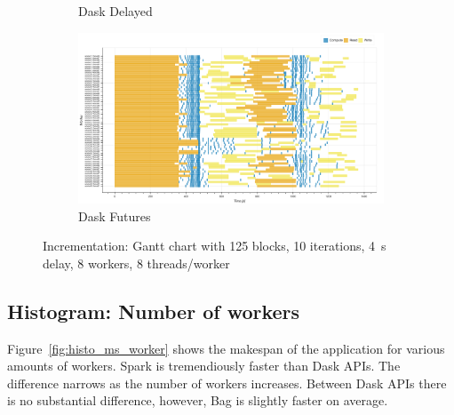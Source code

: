 \documentclass[conference]{IEEEtran}
\begin{document}
\begin{figure}[!htb]
\begin{subfigure}[b]{\columnwidth}
        \caption{Dask Delayed}\label{fig:inc_dask_delayed_gantt}
    \end{subfigure}
    \hfill
    \begin{subfigure}[b]{\columnwidth}
        \includegraphics[clip,width=\columnwidth]{images/futures_inc_gantt.png}%
        \caption{Dask Futures}\label{fig:inc_dask_futures_gantt}
    \end{subfigure}
    \caption{Incrementation: Gantt chart with 125 blocks, 10 iterations, \SI{4}{\second}
delay, 8 workers, 8 threads/worker}\label{fig:inc_gantt}
\end{figure}


\subsection{Histogram: Number of workers}
Figure~\ref{fig:histo_ms_worker} shows the makespan of the application for various
amounts of workers. Spark is tremendiously faster than Dask APIs. The difference
narrows as the number of workers increases. Between Dask APIs there is no substantial
difference, however, Bag is slightly faster on average.
\end{document}
